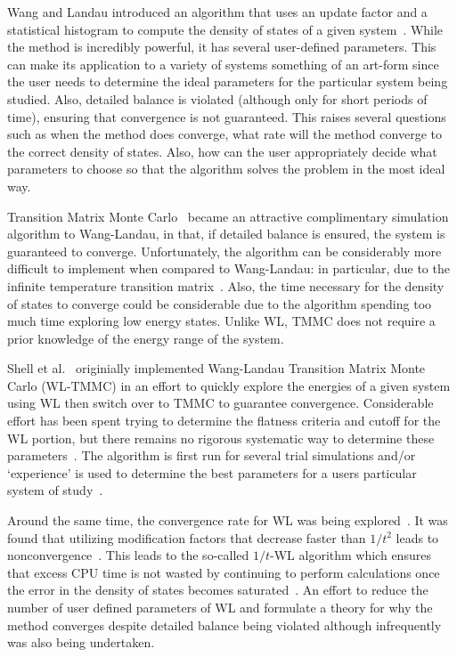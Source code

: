 \documentclass[letterpaper,twocolumn,amsmath,amssymb,pre,aps,10pt]{revtex4-1}
\begin{document}
Wang and Landau introduced an algorithm that uses an update factor and
a statistical histogram to compute the density of states of a given
system~\cite{wang2001determining, wang2001efficient}.  While the method
is incredibly powerful, it has several user-defined parameters.  This
can make its application to a variety of systems something of an
art-form since the user needs to determine the ideal parameters for the
particular system being studied.  Also, detailed balance is violated
(although only for short periods of time), ensuring that convergence is
not guaranteed.  This raises several questions such as when the method
does converge, what rate will the method converge to the correct
density of states. Also, how can the user appropriately decide what
parameters to choose so that the algorithm solves the problem in the
most ideal way.

Transition Matrix Monte Carlo~\cite{wang1999transition,
swendsen1999transition, fitzgerald2000monte} became an attractive
complimentary simulation algorithm to Wang-Landau, in that, if detailed
balance is ensured, the system is guaranteed to converge.  Unfortunately,
the algorithm can be considerably more difficult to implement when
compared to Wang-Landau: in particular, due to the infinite temperature
transition matrix~\cite{wang2002transition}.  Also, the time necessary
for the density of states to converge could be considerable
due to the algorithm spending too much time exploring low energy states.
Unlike WL, TMMC does not require a prior knowledge of the energy range of
the system.

Shell et al.~\cite{shell2003improved, shell2004flat} originially
implemented Wang-Landau Transition Matrix Monte Carlo (WL-TMMC) in an
effort to quickly explore the energies of a given system using WL then
switch over to TMMC to guarantee convergence. Considerable effort has
been spent trying to determine the flatness criteria and cutoff for the
WL portion, but there remains no rigorous systematic way to determine
these parameters~\cite{rane2013monte}.  The algorithm is first run for
several trial simulations and/or `experience' is used to determine the
best parameters for a users particular system of
study~\cite{siderius2013use}.

Around the same time, the convergence rate for WL was being
explored~\cite{zhou2005understanding,lee2006convergence,
belardinelli2007wang}. It was found that utilizing modification factors
that decrease faster than $1/t^2$ leads to
nonconvergence~\cite{belardinelli2007fast}.  This leads to the so-called
$1/t$-WL algorithm which ensures that excess CPU time is not wasted by
continuing to perform calculations once the error in the density of
states becomes saturated~\cite{belardinelli2008analysis}. An effort to
reduce the number of user defined parameters of WL and formulate a
theory for why the method converges despite detailed balance being
violated although infrequently was also being undertaken.
\end{document}
